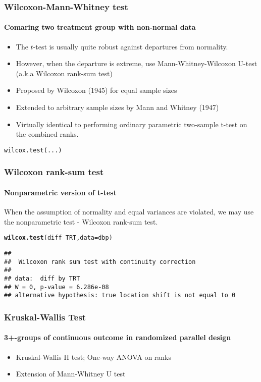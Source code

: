 \documentclass[table,10pt]{beamer}\usepackage[]{graphicx}\usepackage[]{color}
\makeatletter
\newcommand{\hlopt}[1]{\textcolor[rgb]{0,0,0}{#1}}%
\newcommand{\hlstd}[1]{\textcolor[rgb]{0.345,0.345,0.345}{#1}}%
\newcommand{\hlkwc}[1]{\textcolor[rgb]{0.333,0.667,0.333}{#1}}%
\newcommand{\hlkwd}[1]{\textcolor[rgb]{0.737,0.353,0.396}{\textbf{#1}}}%
\newenvironment{kframe}{%
 \def\at@end@of@kframe{}%
 \ifinner\ifhmode%
  \def\at@end@of@kframe{\end{minipage}}%
  \begin{minipage}{\columnwidth}%
 \fi\fi%
 \def\FrameCommand##1{\hskip\@totalleftmargin \hskip-\fboxsep
 \colorbox{shadecolor}{##1}\hskip-\fboxsep
     \hskip-\linewidth \hskip-\@totalleftmargin \hskip\columnwidth}%
 \MakeFramed {\advance\hsize-\width
   \@totalleftmargin\z@ \linewidth\hsize
   \@setminipage}}%
 {\par\unskip\endMakeFramed%
 \at@end@of@kframe}
\newenvironment{knitrout}{}{} %
\makeatother
\begin{document}
\begin{CJK*}{UTF8}{gbsn}
\begin{frame}[t,containsverbatim]
\frametitle{Wilcoxon-Mann-Whitney test}
\framesubtitle{Comaring two treatment group with non-normal data}
\begin{itemize}
	\item The $t$-test is usually quite robust against departures 
		from normality.
	\item However, when the departure is extreme, use 
		Mann-Whitney-Wilcoxon U-test (a.k.a Wilcoxon 
		rank-sum test)
	\item Proposed by Wilcoxon (1945) for equal sample sizes
	\item Extended to arbitrary sample sizes by Mann and Whitney 
		(1947)
	\item Virtually identical to performing ordinary parametric 
		two-sample t-test on the combined ranks.
\end{itemize}
\begin{lstlisting}
wilcox.test(...)
\end{lstlisting}
\end{frame}


\begin{frame}[t,containsverbatim]
\frametitle{Wilcoxon rank-sum test}
\framesubtitle{Nonparametric version of t-test}
When the assumption of normality and equal variances are violated, we 
may use the nonparametric test - Wilcoxon rank-sum test.

\begin{knitrout}\footnotesize
{}\color{fgcolor}\begin{kframe}
\begin{alltt}
\hlkwd{wilcox.test}\hlstd{(diff} \hlopt{~} \hlstd{TRT,} \hlkwc{data}\hlstd{=dbp)}
\end{alltt}


{\ttfamily\noindent\color{warningcolor}{\#\# Warning in wilcox.test.default(x = c(-9L, -15L, -21L, -14L, -11L, -15L, : cannot compute exact p-value with ties}}\begin{verbatim}
## 
## 	Wilcoxon rank sum test with continuity correction
## 
## data:  diff by TRT
## W = 0, p-value = 6.286e-08
## alternative hypothesis: true location shift is not equal to 0
\end{verbatim}
\end{kframe}
\end{knitrout}
\end{frame}

\begin{frame}[t,containsverbatim]
\frametitle{Kruskal-Wallis Test}
\framesubtitle{3+-groups of continuous outcome in randomized parallel design}
\begin{itemize}
	\item Kruskal-Wallis H test; One-way ANOVA on ranks
	\item Extension of Mann-Whitney U test
\end{itemize}


\end{frame}
\end{CJK*}
\end{document}
